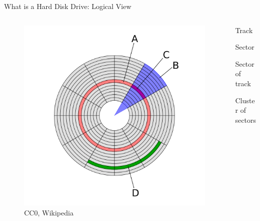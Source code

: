 \documentclass[12pt]{beamer}
\newlength{\wideitemsep}
\let\olditem\item
\renewcommand{\item}{\setlength{\itemsep}{\wideitemsep}\olditem}
\begin{document}
\begin{frame}[fragile]{What is a Hard Disk Drive: Logical View}
 \begin{columns}[c]
 	\begin{column}[c]{.5\textwidth}
 		\begin{figure}[p]
 			\centering
 			\includegraphics[width=\linewidth]{img/logical.png}
 			\caption{CC0, Wikipedia}
 		\end{figure}
 	\end{column}
 	\begin{column}[c]{.5\textwidth}
 		\begin{description}
	 		\item[A] Track
	 		\item[B] Sector
	 		\item[C] Sector of track
	 		\item[D] Cluster of sectors
		\end{description}
 	\end{column}
 \end{columns}
\end{frame}
\end{document}
